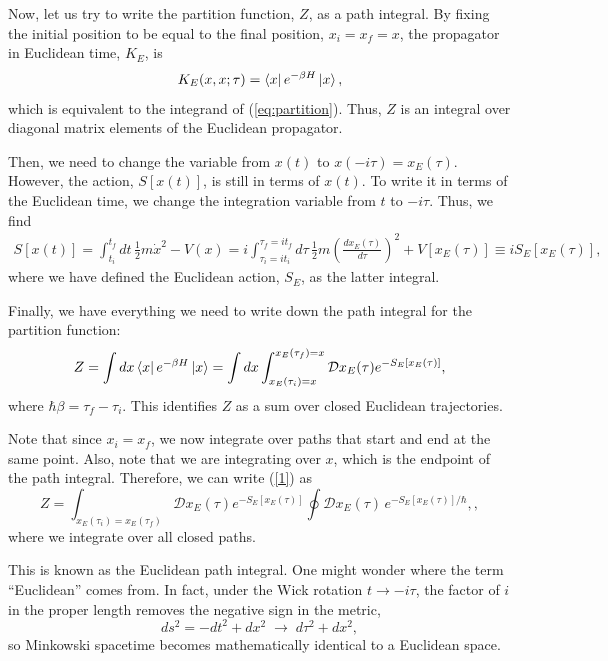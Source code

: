 \documentclass[12pt,a4paper]{article}
\begin{document}
Now, let us try to write the partition function, $Z$, as a path integral.
By fixing the initial position to be equal to the final position, $x_i=x_f=x$, the propagator in Euclidean time, $K_E$, is
\begin{equation}
    K_E(x,x;\tau) = \bra{x}e^{-\beta H}\ket{x},
\end{equation}
which is equivalent to the integrand of (\ref{eq:partition}). Thus, $Z$ is an integral over diagonal matrix elements of the Euclidean propagator.

Then, we need to change the variable from $x(t)$ to $x(-i\tau) =  x_E(\tau)$.
However, the action, $S[x(t)]$, is still in terms of $x(t)$.
To write it in terms of the Euclidean time, we change the integration variable from $t$ to $-i\tau$.
Thus, we find
\begin{equation}
\begin{aligned}
    S[x(t)] = \int^{t_f}_{t_i} dt \,\frac{1}{2}m\dot{x}^2 - V(x)
    = i\int^{\tau_f = it_f}_{\tau_i=it_i}d\tau \,\frac{1}{2}m\left(\frac{dx_E(\tau)}{d\tau}\right)^2 + V[x_E(\tau)]
    \equiv i S_E[x_E(\tau)],
\end{aligned}
\end{equation}
where we have defined the Euclidean action, $S_E$, as the latter integral.

Finally, we have everything we need to write down the path integral for the partition function:
\begin{equation}
    Z = \int dx \bra{x}e^{-\beta H}\ket{x} 
      = \int dx \int_{x_E(\tau_i)=x}^{x_E(\tau_f)=x} \mathcal{D}x_E(\tau)e^{-S_E[x_E(\tau)]},
    \label{1}
\end{equation}
where $\hbar\beta = \tau_f-\tau_i$. This identifies $Z$ as a sum over closed Euclidean trajectories.

Note that since $x_i=x_f$, we now integrate over paths that start and end at the same point.
Also, note that we are integrating over $x$, which is the endpoint of the path integral.
Therefore, we can write (\ref{1}) as
\begin{equation}
    Z  = \int_{x_E(\tau_i)=x_E(\tau_f)}\mathcal{D}x_E(\tau)e^{-S_E[x_E(\tau)]}\oint \mathcal{D}x_E(\tau) \, e^{-S_E[x_E(\tau)]/\hbar},,
\end{equation}
where we integrate over all closed paths.

This is known as the Euclidean path integral.
One might wonder where the term ``Euclidean'' comes from. 
In fact, under the Wick rotation $t \to -i\tau$, the factor of $i$ in the proper length removes the negative sign in the metric,
\[
ds^2 = -dt^2 + dx^2 \;\longrightarrow\; d\tau^2 + dx^2,
\]
so Minkowski spacetime becomes mathematically identical to a Euclidean space.
\end{document}
